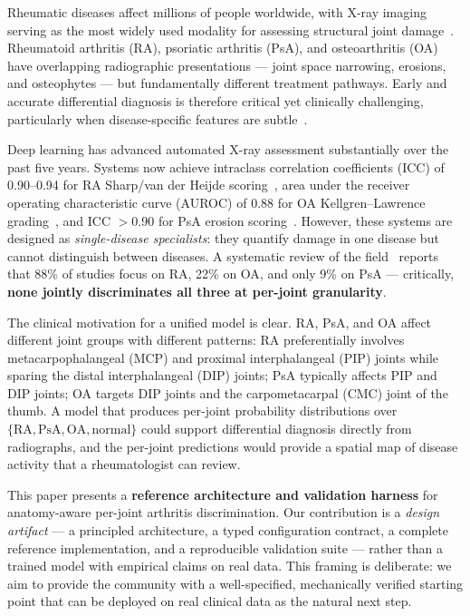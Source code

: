 \documentclass{article}
\begin{document}
Rheumatic diseases affect millions of people worldwide, with X-ray imaging serving as the most widely used modality for assessing structural joint damage~\cite{semin_arthritis2025}. Rheumatoid arthritis (RA), psoriatic arthritis (PsA), and osteoarthritis (OA) have overlapping radiographic presentations --- joint space narrowing, erosions, and osteophytes --- but fundamentally different treatment pathways. Early and accurate differential diagnosis is therefore critical yet clinically challenging, particularly when disease-specific features are subtle~\cite{semin_arthritis2025}.

Deep learning has advanced automated X-ray assessment substantially over the past five years. Systems now achieve intraclass correlation coefficients (ICC) of 0.90--0.94 for RA Sharp/van der Heijde scoring~\cite{autoscora2026}, area under the receiver operating characteristic curve (AUROC) of 0.88 for OA Kellgren--Lawrence grading~\cite{hugle2025}, and ICC $>$0.90 for PsA erosion scoring~\cite{psavit2024}. However, these systems are designed as \emph{single-disease specialists}: they quantify damage in one disease but cannot distinguish between diseases. A systematic review of the field~\cite{semin_arthritis2025} reports that 88\% of studies focus on RA, 22\% on OA, and only 9\% on PsA --- critically, \textbf{none jointly discriminates all three at per-joint granularity}.

The clinical motivation for a unified model is clear. RA, PsA, and OA affect different joint groups with different patterns: RA preferentially involves metacarpophalangeal (MCP) and proximal interphalangeal (PIP) joints while sparing the distal interphalangeal (DIP) joints; PsA typically affects PIP and DIP joints; OA targets DIP joints and the carpometacarpal (CMC) joint of the thumb. A model that produces per-joint probability distributions over $\{\text{RA}, \text{PsA}, \text{OA}, \text{normal}\}$ could support differential diagnosis directly from radiographs, and the per-joint predictions would provide a spatial map of disease activity that a rheumatologist can review.

This paper presents a \textbf{reference architecture and validation harness} for anatomy-aware per-joint arthritis discrimination. Our contribution is a \emph{design artifact} --- a principled architecture, a typed configuration contract, a complete reference implementation, and a reproducible validation suite --- rather than a trained model with empirical claims on real data. This framing is deliberate: we aim to provide the community with a well-specified, mechanically verified starting point that can be deployed on real clinical data as the natural next step.
\end{document}
